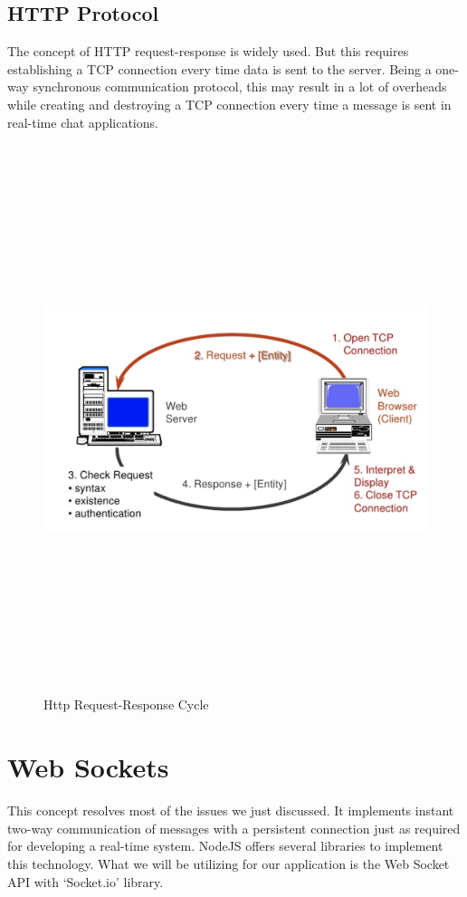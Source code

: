 \subsection{HTTP Protocol}
The concept of HTTP request-response is widely used. But this requires establishing a TCP connection every time data is sent to the server. Being a one-way synchronous communication protocol, this may result in a lot of overheads while creating and destroying a TCP connection every time a message is sent in real-time chat applications.
\begin{figure}[H]
	\centering
	\includegraphics[width=140mm, height=160mm]{images/Http_request-response_cycle.png}
	\caption{Http Request-Response Cycle} %
	\label{figusecase} %
\end{figure}



\section{Web Sockets}
This concept resolves most of the issues we just discussed. It implements instant two-way communication of messages with a persistent connection just as required for developing a real-time system. NodeJS offers several libraries to implement this technology. What we will be utilizing for our application is the Web Socket API with ‘Socket.io’ library.
